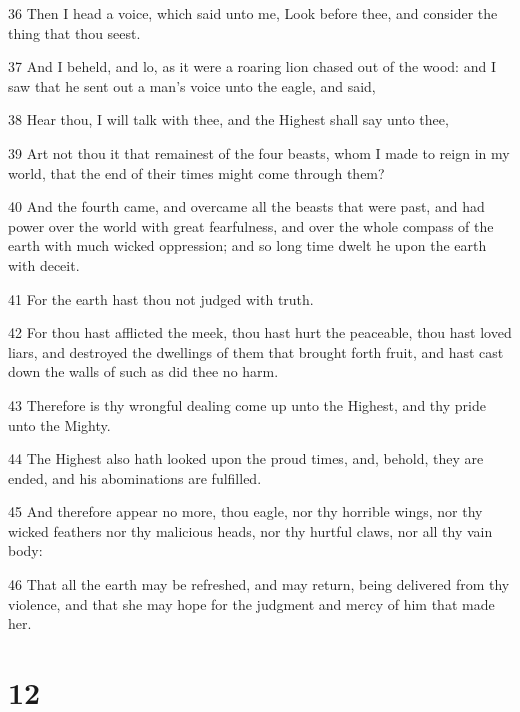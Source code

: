 \par 36 Then I head a voice, which said unto me, Look before thee, and consider the thing that thou seest.
\par 37 And I beheld, and lo, as it were a roaring lion chased out of the wood: and I saw that he sent out a man's voice unto the eagle, and said,
\par 38 Hear thou, I will talk with thee, and the Highest shall say unto thee,
\par 39 Art not thou it that remainest of the four beasts, whom I made to reign in my world, that the end of their times might come through them?
\par 40 And the fourth came, and overcame all the beasts that were past, and had power over the world with great fearfulness, and over the whole compass of the earth with much wicked oppression; and so long time dwelt he upon the earth with deceit.
\par 41 For the earth hast thou not judged with truth.
\par 42 For thou hast afflicted the meek, thou hast hurt the peaceable, thou hast loved liars, and destroyed the dwellings of them that brought forth fruit, and hast cast down the walls of such as did thee no harm.
\par 43 Therefore is thy wrongful dealing come up unto the Highest, and thy pride unto the Mighty.
\par 44 The Highest also hath looked upon the proud times, and, behold, they are ended, and his abominations are fulfilled.
\par 45 And therefore appear no more, thou eagle, nor thy horrible wings, nor thy wicked feathers nor thy malicious heads, nor thy hurtful claws, nor all thy vain body:
\par 46 That all the earth may be refreshed, and may return, being delivered from thy violence, and that she may hope for the judgment and mercy of him that made her.

\chapter{12}

